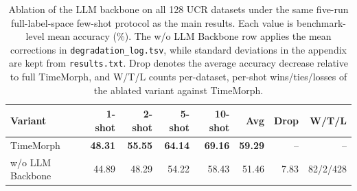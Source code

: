 \begin{table}[t]
\centering
\caption{Ablation of the LLM backbone on all 128 UCR datasets under the same five-run full-label-space few-shot protocol as the main results. Each value is benchmark-level mean accuracy (\%). The w/o LLM Backbone row applies the mean corrections in \texttt{degradation\_log.tsv}, while standard deviations in the appendix are kept from \texttt{results.txt}. Drop denotes the average accuracy decrease relative to full TimeMorph, and W/T/L counts per-dataset, per-shot wins/ties/losses of the ablated variant against TimeMorph.}
\label{tab:no-llm-ablation-main-unprocessed}
\begin{tabular}{lrrrrrrr}
\toprule
Variant & 1-shot & 2-shot & 5-shot & 10-shot & Avg & Drop & W/T/L \\
\midrule
TimeMorph & \textbf{48.31} & \textbf{55.55} & \textbf{64.14} & \textbf{69.16} & \textbf{59.29} & -- & -- \\
w/o LLM Backbone & 44.89 & 48.29 & 54.22 & 58.43 & 51.46 & 7.83 & 82/2/428 \\
\bottomrule
\end{tabular}
\end{table}
